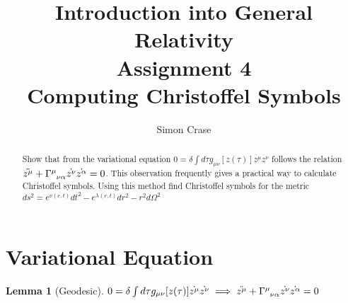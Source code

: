 \documentclass[]{article}
\title{Introduction into General Relativity\\Assignment 4\\Computing Christoffel Symbols}
\author{Simon Crase}
\newtheorem{theorem}{Lemma}
\begin{document}
\maketitle
\thispagestyle{fancy}
\raggedright
\begin{abstract}

Show that from the variational equation $0=\delta \int d \tau g_{\mu\nu}[z(\tau)] \dot{z^{\mu}} \dot{z^{\nu}} $ follows the relation $\ddot{z^{\mu}}+\Gamma\indices{^\mu_\nu_\alpha} \dot{z^{\nu}} \dot{z^{\alpha}}=0$.
 This observation frequently gives a practical way to calculate Christoffel symbols.
Using this method find Christoffel symbols for the metric
$ds^2 = e^{\nu(r,t)} dt^2 - e^{\lambda(r,t)} dr ^ 2 -r^2 d\Omega^2$
\end{abstract}

\section{Variational Equation}
\begin{theorem} [Geodesic]
	\label{lemma:geodesic}
	$0=\delta \int d \tau g_{\mu\nu}[z(\tau)] \dot{z^{\mu}} \dot{z^{\nu}} \implies \ddot{z^{\mu}} + \Gamma\indices{^\mu_\nu_\alpha} \dot{z^{\nu}} \dot{z^{\alpha}}=0$
\end{theorem}
\end{document}
